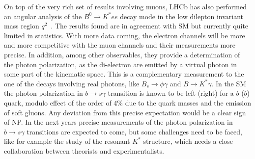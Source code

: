 On top of the very rich set of results involving muons, LHCb has also performed an angular analysis  of the $B^0\to K^\ast e e $ decay mode in the low dilepton invariant mass region $q^2$~\cite{Aaij:2015dea}. The results found  are in agreement with SM but currently quite limited in statistics.    With more data coming, the electron channels will be more and more competitive with the muon channels and their measurements more precise. In addition, among other observables, they  provide a  determination of the photon polarization, as the di-electron are emitted by a virtual photon in some part of the kinematic space.  This is a complementary measurement to the one of the decays involving real photons, like $B_s \to \phi \gamma$ and $B\to K^* \gamma$.  In the SM the photon polarization  in $b \to s \gamma$ transition is  known to be left (right) for a $b$ ($\bar b$) quark, modulo effect of the order of $4\%$  due to the quark masses and the emission of soft gluons. Any deviation from this precise expectation would be a clear sign of NP.  In the next years precise measurements of the photon polarization in $b \to s \gamma$ transitions are expected to come, but some challenges need to be faced, like for example the study of the resonant $K^*$ structure, which needs a close collaboration between theorists and experimentalists. 


